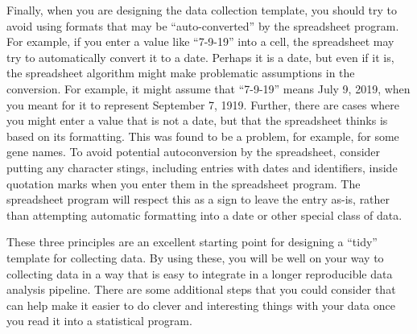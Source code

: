 \documentclass[]{tufte-book}
\begin{document}
Finally, when you are designing the data collection template, you should try to
avoid using formats that may be ``auto-converted'' by the spreadsheet program. For
example, if you enter a value like ``7-9-19'' into a cell, the spreadsheet may try
to automatically convert it to a date. Perhaps it is a date, but even if it is,
the spreadsheet algorithm might make problematic assumptions in the conversion.
For example, it might assume that ``7-9-19'' means July 9, 2019, when you meant
for it to represent September 7, 1919. Further, there are cases where you might
enter a value that is not a date, but that the spreadsheet thinks is based on
its formatting. This was found to be a problem, for example, for some gene
names. To avoid potential autoconversion by the spreadsheet, consider putting
any character stings, including entries with dates and identifiers, inside
quotation marks when you enter them in the spreadsheet program. The spreadsheet
program will respect this as a sign to leave the entry as-is, rather than
attempting automatic formatting into a date or other special class of data.

These three principles are an excellent starting point for designing a ``tidy''
template for collecting data. By using these, you will be well on your way to
collecting data in a way that is easy to integrate in a longer reproducible data
analysis pipeline. There are some additional steps that you could consider that
can help make it easier to do clever and interesting things with your data once
you read it into a statistical program.
\end{document}
